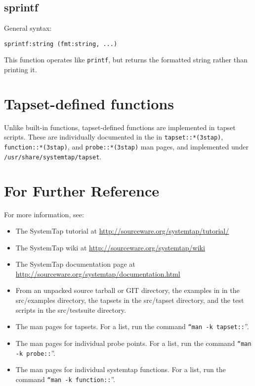 \documentclass[twoside,english]{article}
\newenvironment{vindent}
{\begin{list}{}{\setlength{\listparindent}{6pt}}
\item[]}
{\end{list}}
\begin{document}
\subsection{sprintf}
General syntax:

\begin{vindent}
\begin{verbatim}
sprintf:string (fmt:string, ...)
\end{verbatim}
\end{vindent}
This function operates like \texttt{printf}, but returns the formatted string
rather than printing it.

\section{Tapset-defined functions\label{sec:Predefined-Functions}}

Unlike built-in functions, tapset-defined functions are implemented in tapset scripts.
These are individually documented in the in \texttt{tapset::*(3stap)}, 
\texttt{function::*(3stap)},
and \texttt{probe::*(3stap)} man pages, and implemented under
\texttt{/usr/share/systemtap/tapset}.

\section{For Further Reference\label{sec:For-Further-Reference}}

For more information, see:
\begin{itemize}
\item The SystemTap tutorial at \url{http://sourceware.org/systemtap/tutorial/}
\item The SystemTap wiki at \url{http://sourceware.org/systemtap/wiki}
\item The SystemTap documentation page at \url{http://sourceware.org/systemtap/documentation.html}
\item From an unpacked source tarball or GIT directory, the examples in in the
src/examples directory, the tapsets in the src/tapset directory, and the
test scripts in the src/testsuite directory.
\item The man pages for tapsets.
For a list, run the command \texttt{{}``man -k tapset::}''.
\item The man pages for individual probe points.
For a list, run the command \texttt{{}``man -k probe::}''.
\item The man pages for individual systemtap functions.
For a list, run the command \texttt{{}``man -k function::}''.
\end {itemize}

\setcounter{secnumdepth}{0}
\newpage{}
\printindex{}
\end{document}
